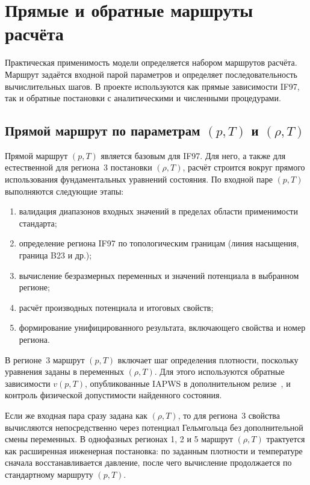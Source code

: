 \section{Прямые и обратные маршруты расчёта}

Практическая применимость модели определяется набором маршрутов расчёта.
Маршрут задаётся входной парой параметров
и определяет последовательность вычислительных шагов.
В проекте используются как прямые зависимости IF97,
так и обратные постановки с аналитическими и численными процедурами.

\subsection{Прямой маршрут по параметрам \texorpdfstring{$(p, T)$ и $(\rho, T)$}{(p, T) и (rho, T)}}

Прямой маршрут $(p, T)$ является базовым для IF97.
Для него, а также для естественной для региона~3 постановки $(\rho, T)$,
расчёт строится вокруг прямого использования фундаментальных уравнений состояния.
По входной паре $(p, T)$ выполняются следующие этапы:
\begin{enumerate}
\item валидация диапазонов входных значений в пределах области применимости стандарта;
\item определение региона IF97 по топологическим границам (линия насыщения, граница B23 и др.);
\item вычисление безразмерных переменных и значений потенциала в выбранном регионе;
\item расчёт производных потенциала и итоговых свойств;
\item формирование унифицированного результата, включающего свойства и номер региона.
\end{enumerate}

В регионе~3 маршрут $(p, T)$ включает шаг определения плотности,
поскольку уравнения заданы в переменных $(\rho, T)$.
Для этого используются обратные зависимости $v(p, T)$,
опубликованные IAPWS в дополнительном релизе~\cite{iapws_vpt_region3},
и контроль физической допустимости найденного состояния.

Если же входная пара сразу задана как $(\rho, T)$,
то для региона~3 свойства вычисляются непосредственно
через потенциал Гельмгольца без дополнительной смены переменных.
В однофазных регионах 1, 2 и 5
маршрут $(\rho, T)$ трактуется как расширенная инженерная постановка:
по заданным плотности и температуре сначала восстанавливается давление,
после чего вычисление продолжается по стандартному маршруту $(p, T)$.

